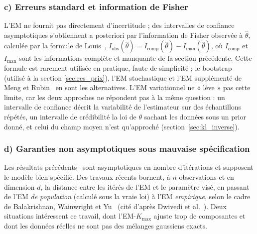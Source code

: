 \subsubsection{c) Erreurs standard et information de Fisher}\label{sec:c_erreurs_standard_et_information}
L'EM ne fournit pas directement d'incertitude ; des intervalles de confiance asymptotiques s'obtiennent a posteriori par l'information de Fisher observée à $\hat{\theta }$, calculée par la formule de Louis~\cite{louis1982}, $I_{\text{obs}}(\hat{\theta }) = I_{\text{comp}}(\hat{\theta }) - I_{\text{man}}(\hat{\theta })$, où $I_{\text{comp}}$ et $I_{\text{man}}$ sont les informations complète et manquante de la section précédente. Cette formule est rarement utilisée en pratique, faute de simplicité ; le bootstrap (utilisé à la section \ref{sec:res_prix}), l'EM stochastique et l'EM supplémenté de Meng et Rubin~\cite{meng1991} en sont les alternatives. L'EM variationnel ne « lève » pas cette limite, car les deux approches ne répondent pas à la même question : un intervalle de confiance décrit la variabilité de l'estimateur sur des échantillons répétés, un intervalle de crédibilité la loi de $\theta$ sachant les données sous un prior donné, et celui du champ moyen n'est qu'approché (section~\ref{sec:kl_inverse}).

\subsubsection{d) Garanties non asymptotiques sous mauvaise spécification}\label{sec:d_garanties_non_asymptotiques_sous}
Les résultats précédents~\cite{dempster1977,wu1983} sont asymptotiques en nombre d'itérations et supposent le modèle bien spécifié. Des travaux récents bornent, à $n$ observations et en dimension $d$, la distance entre les itérés de l'EM et le paramètre visé, en passant de l'EM \emph{de population} (calculé sous la vraie loi) à l'EM \emph{empirique}, selon le cadre de Balakrishnan, Wainwright et Yu~\cite{balakrishnan2017} (cité d'après Dwivedi et al.~\cite{dwivedi2020}). Deux situations intéressent ce travail, dont l'EM-$K_{\max}$ ajuste trop de composantes et dont les données réelles ne sont pas des mélanges gaussiens exacts.

